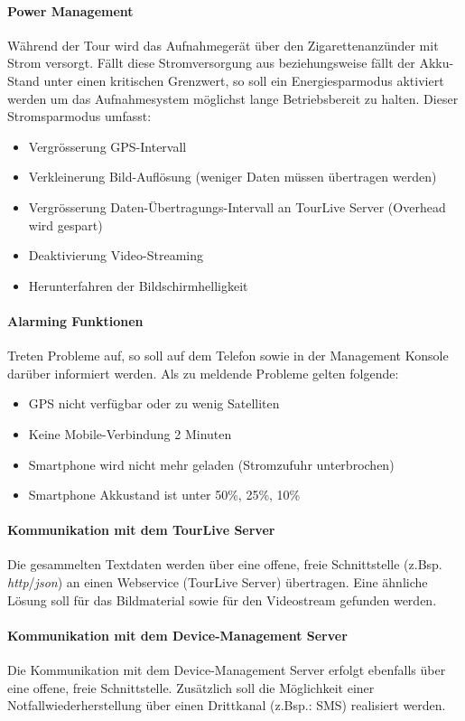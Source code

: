 \paragraph{Power Management}
Während der Tour wird das Aufnahmegerät über den Zigarettenanzünder mit Strom versorgt. Fällt diese Stromversorgung aus beziehungsweise fällt der Akku-Stand unter einen kritischen Grenzwert, so soll ein Energiesparmodus aktiviert werden um das Aufnahmesystem möglichst lange Betriebsbereit zu halten. Dieser Stromsparmodus umfasst:
\begin{itemize}
\item Vergrösserung GPS-Intervall
\item Verkleinerung Bild-Auflösung (weniger Daten müssen übertragen werden)
\item Vergrösserung Daten-Übertragungs-Intervall an TourLive Server (Overhead wird gespart)
\item Deaktivierung Video-Streaming
\item Herunterfahren der Bildschirmhelligkeit
\end{itemize}

\label{par:alarming}
\paragraph{Alarming Funktionen}
Treten Probleme auf, so soll auf dem Telefon sowie in der Management Konsole darüber informiert werden. Als zu meldende Probleme gelten folgende:
\begin{itemize}
\item GPS nicht verfügbar oder zu wenig Satelliten
\item Keine Mobile-Verbindung 2 Minuten
\item Smartphone wird nicht mehr geladen (Stromzufuhr unterbrochen)
\item Smartphone Akkustand ist unter 50\%, 25\%, 10\%
\end{itemize}

	
\paragraph{Kommunikation mit dem TourLive Server}
Die gesammelten Textdaten werden über eine offene, freie Schnittstelle (z.Bsp. \textit{\gls{http}}/\textit{\gls{json}}) an einen Webservice (TourLive Server) übertragen. Eine ähnliche Lösung soll für das Bildmaterial sowie für den Videostream gefunden werden.

\paragraph{Kommunikation mit dem Device-Management Server}
Die Kommunikation mit dem Device-Management Server erfolgt ebenfalls über eine offene, freie Schnittstelle. Zusätzlich soll die Möglichkeit einer Notfallwiederherstellung über einen Drittkanal (z.Bsp.: SMS) realisiert werden.

